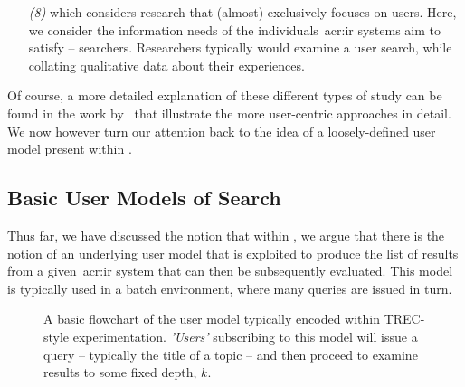 \begin{itemize}
    
    \item[\emph{(8)}]{ which considers research that (almost) exclusively focuses on users. Here, we consider the information needs of the individuals~\gls{acr:ir} systems aim to satisfy -- searchers. Researchers typically would examine a user search, while collating qualitative data about their experiences.}
    
\end{itemize}

Of course, a more detailed explanation of these different types of study can be found in the work by~\cite{kelly2009iir} that illustrate the more user-centric approaches in detail. We now however turn our attention back to the idea of a loosely-defined user model present within .

\subsection{Basic User Models of Search}\label{sec:ir_background:user:models}
Thus far, we have discussed the notion that within , we argue that there is the notion of an underlying user model that is exploited to produce the list of results from a given~\gls{acr:ir} system that can then be subsequently evaluated. This model is typically used in a batch environment, where many queries are issued in turn.

\begin{figure}[t!]
    \centering
    \caption[The TREC-style user model]{A basic flowchart of the user model typically encoded within TREC-style experimentation. \emph{'Users'} subscribing to this model will issue a query – typically the title of a topic – and then proceed to examine results to some fixed depth, $k$.}
    \label{fig:trec_model}
\end{figure}

